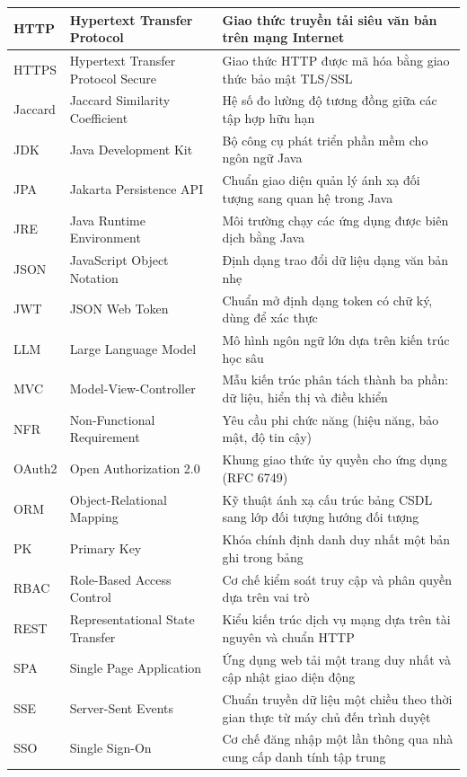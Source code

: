 \begin{longtable}{|p{2.8cm}|p{5.5cm}|p{6.7cm}|}
HTTP & Hypertext Transfer Protocol & Giao thức truyền tải siêu văn bản trên mạng Internet \\ \hline
HTTPS & Hypertext Transfer Protocol Secure & Giao thức HTTP được mã hóa bằng giao thức bảo mật TLS/SSL \\ \hline
Jaccard & Jaccard Similarity Coefficient & Hệ số đo lường độ tương đồng giữa các tập hợp hữu hạn \\ \hline
JDK & Java Development Kit & Bộ công cụ phát triển phần mềm cho ngôn ngữ Java \\ \hline
JPA & Jakarta Persistence API & Chuẩn giao diện quản lý ánh xạ đối tượng sang quan hệ trong Java \\ \hline
JRE & Java Runtime Environment & Môi trường chạy các ứng dụng được biên dịch bằng Java \\ \hline
JSON & JavaScript Object Notation & Định dạng trao đổi dữ liệu dạng văn bản nhẹ \\ \hline
JWT & JSON Web Token & Chuẩn mở định dạng token có chữ ký, dùng để xác thực \\ \hline
LLM & Large Language Model & Mô hình ngôn ngữ lớn dựa trên kiến trúc học sâu \\ \hline
MVC & Model-View-Controller & Mẫu kiến trúc phân tách thành ba phần: dữ liệu, hiển thị và điều khiển \\ \hline
NFR & Non-Functional Requirement & Yêu cầu phi chức năng (hiệu năng, bảo mật, độ tin cậy) \\ \hline
OAuth2 & Open Authorization 2.0 & Khung giao thức ủy quyền cho ứng dụng (RFC 6749) \\ \hline
ORM & Object-Relational Mapping & Kỹ thuật ánh xạ cấu trúc bảng CSDL sang lớp đối tượng hướng đối tượng \\ \hline
PK & Primary Key & Khóa chính định danh duy nhất một bản ghi trong bảng \\ \hline
RBAC & Role-Based Access Control & Cơ chế kiểm soát truy cập và phân quyền dựa trên vai trò \\ \hline
REST & Representational State Transfer & Kiểu kiến trúc dịch vụ mạng dựa trên tài nguyên và chuẩn HTTP \\ \hline
SPA & Single Page Application & Ứng dụng web tải một trang duy nhất và cập nhật giao diện động \\ \hline
SSE & Server-Sent Events & Chuẩn truyền dữ liệu một chiều theo thời gian thực từ máy chủ đến trình duyệt \\ \hline
SSO & Single Sign-On & Cơ chế đăng nhập một lần thông qua nhà cung cấp danh tính tập trung \\ \hline

\end{longtable}
